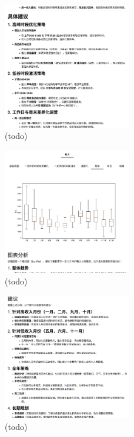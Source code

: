 \begin{figure}[htbp]
	\centering
	\includegraphics[width=0.5\textwidth]{./exp/aly-demo-2.png}
	\caption{(todo)}
	\label{fig:aly-demo-2}
\end{figure}

\begin{figure}[htbp]
	\centering
	\includegraphics[width=0.5\textwidth]{./exp/aly-demo-3.png}
	\caption{(todo)}
	\label{fig:aly-demo-3}
\end{figure}

\begin{figure}[htbp]
	\centering
	\includegraphics[width=0.5\textwidth]{./exp/aly-demo-4.png}
	\caption{(todo)}
	\label{fig:aly-demo-4}
\end{figure}

